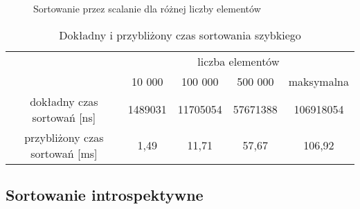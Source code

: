 \begin{figure}[H]
{\begin{tikzpicture}[scale=0.9]
        \end{tikzpicture}
    } \quad
    \caption{Sortowanie przez scalanie dla różnej liczby elementów}
    \label{fig: scalanie}
\end{figure}


\begin{table}[H]
    \caption{Dokładny i przybliżony czas sortowania szybkiego}
    \label{tab: czas_szybkie}
    \begin{tabular}{c|cccc|}
    \cline{2-5}
                                                             & \multicolumn{4}{c|}{liczba elementów}                                                                     \\ \cline{2-5} 
                                                             & \multicolumn{1}{c|}{10 000}  & \multicolumn{1}{c|}{100 000}  & \multicolumn{1}{c|}{500 000}  & maksymalna \\ \hline
    \multicolumn{1}{|c|}{dokładny czas sortowań {[}ns{]}}    & \multicolumn{1}{c|}{1489031} & \multicolumn{1}{c|}{11705054} & \multicolumn{1}{c|}{57671388} & 106918054  \\ \hline
    \multicolumn{1}{|c|}{przybliżony czas sortowań {[}ms{]}} & \multicolumn{1}{c|}{1,49}    & \multicolumn{1}{c|}{11,71}    & \multicolumn{1}{c|}{57,67}    & 106,92     \\ \hline
    \end{tabular}
    \end{table}


\subsection{Sortowanie introspektywne}

